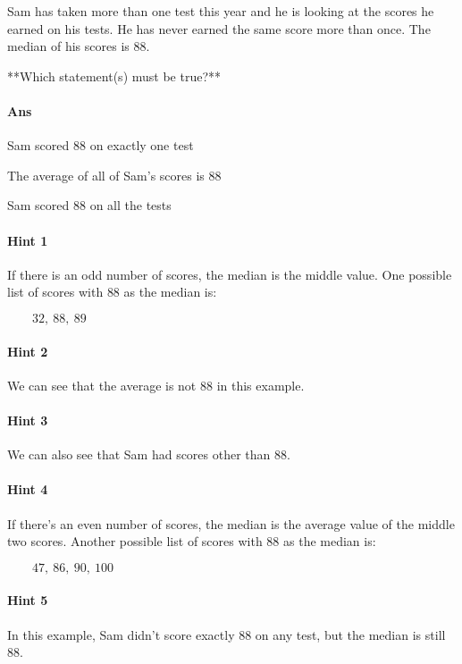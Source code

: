 \documentclass[twocolumn,10pt]{article}
\begin{document}
\noindent
Sam has taken more than one test this year and he is looking at the scores he earned on his tests.  He has never earned the same score more than once. The median of his scores is $88$. 

**Which statement(s) must be true?**

\paragraph{Ans} 

Sam scored $88$ on exactly one test


 The average of all of Sam's scores is $88$

Sam scored $88$ on all the tests



\paragraph{Hint 1}If there is an odd number of scores, the median is the middle value. One possible list of scores with $88$ as the median is:

$\qquad 32,~88,~89$

\paragraph{Hint 2}We can see that the average is not $88$ in this example.

\paragraph{Hint 3}We can also see that Sam had scores other than $88$.

\paragraph{Hint 4}If there's an even number of scores, the median is the average value of the middle two scores. Another possible list of scores with $88$ as the median is:

$\qquad 47,~86,~90, ~100$

\paragraph{Hint 5}In this example, Sam didn't score exactly $88$ on any test, but the median is still $88$.
\end{document}
